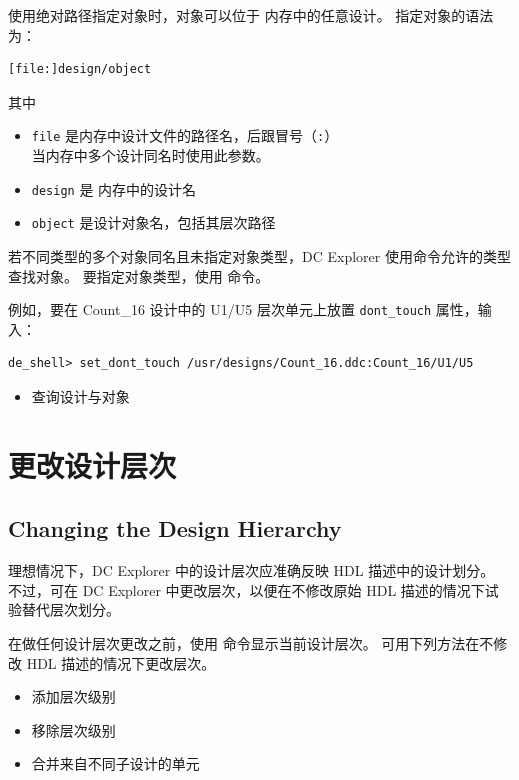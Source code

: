 使用绝对路径指定对象时，对象可以位于  内存中的任意设计。
指定对象的语法为：
\begin{lstlisting}
[file:]design/object
\end{lstlisting}
其中
\begin{itemize}
  \item \texttt{file} 是内存中设计文件的路径名，后跟冒号（\texttt{:}）\\
        当内存中多个设计同名时使用此参数。
  \item \texttt{design} 是  内存中的设计名
  \item \texttt{object} 是设计对象名，包括其层次路径
\end{itemize}

若不同类型的多个对象同名且未指定对象类型，DC Explorer 使用命令允许的类型查找对象。
要指定对象类型，使用  命令。

例如，要在 Count\_16 设计中的 U1/U5 层次单元上放置 \texttt{dont\_touch} 属性，输入：
\begin{lstlisting}
de_shell> set_dont_touch /usr/designs/Count_16.ddc:Count_16/U1/U5
\end{lstlisting}

\begin{seeAlsoBox}
\begin{itemize}
  \item 查询设计与对象
\end{itemize}
\end{seeAlsoBox}

\section{更改设计层次}
\subsection*{Changing the Design Hierarchy}

理想情况下，DC Explorer 中的设计层次应准确反映 HDL 描述中的设计划分。
不过，可在 DC Explorer 中更改层次，以便在不修改原始 HDL 描述的情况下试验替代层次划分。

在做任何设计层次更改之前，使用  命令显示当前设计层次。
可用下列方法在不修改 HDL 描述的情况下更改层次。
\begin{itemize}
  \item 添加层次级别
  \item 移除层次级别
  \item 合并来自不同子设计的单元
\end{itemize}

